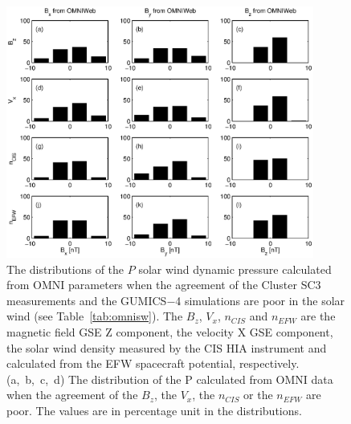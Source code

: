 \documentclass[linenumbers,draft]{agujournal}
\begin{document}
\begin{figure}[h]
\centering
\includegraphics[width=0.9\textwidth,angle=0]{swe-2020-corr-f17.eps}  
\caption{The distributions of the $P$ solar wind dynamic pressure calculated from OMNI parameters when the agreement of the Cluster SC3 measurements and the GUMICS$-$4 simulations are poor in the solar wind (see Table~\ref{tab:omnisw}). The $B_{z}$, $V_{x}$, $n_{CIS}$ and $n_{EFW}$ are the magnetic field GSE Z component, the velocity X GSE component, the solar wind density measured by the CIS HIA instrument and calculated from the EFW spacecraft potential, respectively. (a,~b,~c,~d) The distribution of the P calculated from OMNI data when the agreement of the $B_{z}$, the $V_{x}$, the $n_{CIS}$ or the $n_{EFW}$ are poor. The values are in percentage unit in the distributions.}
\label{fig:swomnip}
\end{figure}

\pagebreak
\end{document}
